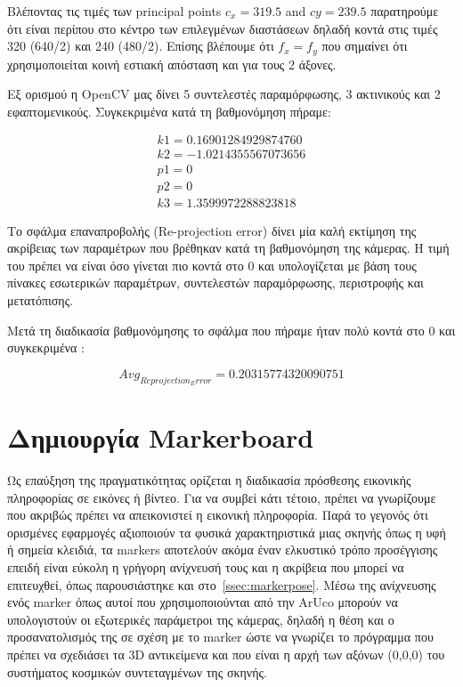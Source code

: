 Βλέποντας τις τιμές των principal points $c_{x}=319.5$ and $c{y}=239.5$ παρατηρούμε ότι είναι περίπου στο κέντρο των επιλεγμένων διαστάσεων δηλαδή κοντά στις τιμές  320 (640/2) και 240 (480/2). Επίσης βλέπουμε ότι $f_{x}=f_{y}$ που σημαίνει ότι χρησιμοποιείται κοινή εστιακή απόσταση και για τους 2 άξονες.


Εξ ορισμού η OpenCV μας δίνει 5 συντελεστές παραμόρφωσης, 3 ακτινικούς και 2 εφαπτομενικούς. Συγκεκριμένα κατά τη βαθμονόμηση πήραμε:

\begin{equation}
\begin{aligned}
k1= 0.16901284929874760\\
k2= -1.0214355567073656\\
p1= 0\\
p2= 0\\
k3= 1.3599972288823818 
\end{aligned}
\end{equation}

Το σφάλμα επαναπροβολής (Re-projection error) δίνει μία καλή εκτίμηση της ακρίβειας των παραμέτρων που βρέθηκαν κατά τη βαθμονόμηση της κάμερας. Η τιμή του πρέπει να είναι όσο γίνεται πιο κοντά στο 0 και υπολογίζεται με βάση τους πίνακες εσωτερικών παραμέτρων, συντελεστών παραμόρφωσης, περιστροφής και μετατόπισης. 


Μετά τη διαδικασία βαθμονόμησης το σφάλμα που πήραμε ήταν πολύ κοντά στο 0 και συγκεκριμένα :

\begin{equation}
Avg_{Reprojection_Error} = 0.20315774320090751
\end{equation}


\section{Δημιουργία Markerboard}


Ως επαύξηση της πραγματικότητας ορίζεται η διαδικασία πρόσθεσης εικονικής πληροφορίας σε εικόνες ή βίντεο. Για να συμβεί κάτι τέτοιο, πρέπει να γνωρίζουμε που ακριβώς πρέπει να απεικονιστεί η εικονική πληροφορία. Παρά το γεγονός ότι ορισμένες εφαρμογές αξιοποιούν τα φυσικά χαρακτηριστικά μιας σκηνής όπως η υφή ή σημεία κλειδιά, τα markers αποτελούν ακόμα έναν ελκυστικό τρόπο προσέγγισης επειδή είναι εύκολη η γρήγορη ανίχνευσή τους και η ακρίβεια που μπορεί να επιτευχθεί, όπως παρουσιάστηκε και στο~\ref{ssec:markerpose}. Μέσω της ανίχνευσης ενός marker όπως αυτοί που χρησιμοποιούνται από την ArUco μπορούν να υπολογιστούν οι εξωτερικές παράμετροι της κάμερας, δηλαδή η θέση και ο προσανατολισμός της σε σχέση με το marker ώστε να γνωρίζει το πρόγραμμα που πρέπει να σχεδιάσει τα 3D αντικείμενα και που είναι η αρχή των αξόνων (0,0,0) του συστήματος κοσμικών συντεταγμένων της σκηνής. 



